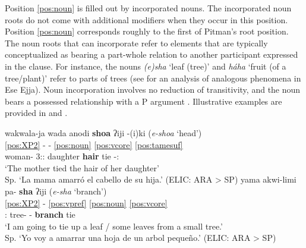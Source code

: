 \documentclass[output=paper,hidelinks]{langscibook}
\begin{document}
Position \ref{pos:noun} is filled out by incorporated nouns. The incorporated noun roots do not come with additional modifiers when they occur in this position. Position \ref{pos:noun} corresponds roughly to the first of Pitman's root position. The noun roots that can incorporate refer to elements that are typically conceptualized as bearing a part-whole relation to another participant expressed in the clause. For instance, the nouns \textit{(e)sha} `leaf (tree)' and \textit{háha} `fruit (of a tree/plant)' refer to parts of trees (see \citealt{vuillermet:2014} for an analysis of analogous phenomena in Ese Ejja). Noun incorporation involves no reduction of transitivity, and the noun bears a possessed relationship with a P argument \citep[117]{emkow:2019:araonarepublish}. Illustrative examples are provided in  and .

\ea 
 \ea \label{ex:shoaiji}
    \glll wakwala-ja wada anodi \textbf{shoa} ʔiji -(i)ki \hfill (\textit{e-shoa} `head')  \\
	\ref{pos:XP2} - - \ref{pos:noun} \ref{pos:vcore} \ref{pos:tamesuf}  \\
    woman-\Erg{} 3:\Sg{}:\Gen{} daughter \textbf{hair} tie -\Recp{}:\Pst{}  \\
	\glt `The mother tied the hair of her daughter'	\\ Sp. `La mama amarró el cabello de su hija.'
 \hfill (ELIC: ARA > SP)
 \ex \label{ex:pasha-iji}
    \glll yama akwi-limi pa- \textbf{sha} ʔiji \hfill (\textit{e-sha} `branch') \\
	\ref{pos:XP2} - \ref{pos:vpref} \ref{pos:noun} \ref{pos:vcore}  \\
    \Fsg{}:\Erg{} tree-\Dim{} \Post{}- \textbf{branch} tie \\
	\glt `I am going to tie up a leaf / some leaves from a small tree.' \\ Sp. `Yo voy a amarrar una hoja de un arbol pequeño.'
 \hfill (ELIC: ARA > SP)
  \z
\z


\end{document}
